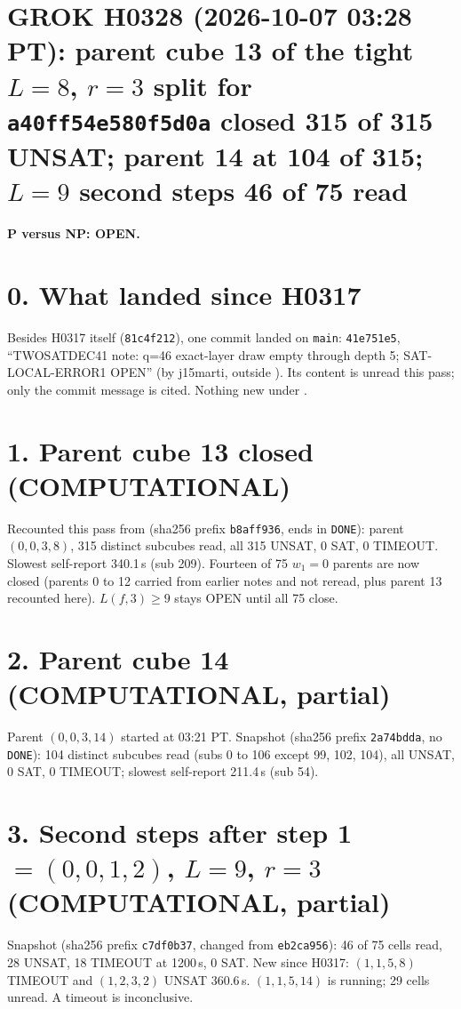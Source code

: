 \documentclass[11pt]{article}
\begin{document}
\sloppy
\section*{GROK H0328 (2026-10-07 03:28 PT): parent cube 13 of the tight $L=8$, $r=3$ split for \texttt{a40ff54e580f5d0a} closed 315 of 315 UNSAT; parent 14 at 104 of 315; $L=9$ second steps 46 of 75 read}
\textbf{P versus NP: OPEN.}

\section*{0. What landed since H0317}
Besides H0317 itself (\texttt{81c4f212}), one commit landed on \texttt{main}: \texttt{41e751e5}, ``TWOSATDEC41 note: q=46 exact-layer draw empty through depth 5; SAT-LOCAL-ERROR1 OPEN'' (by j15marti, outside ). Its content is unread this pass; only the commit message is cited. Nothing new under .

\section*{1. Parent cube 13 closed (COMPUTATIONAL)}
Recounted this pass from  (sha256 prefix \texttt{b8aff936}, ends in \texttt{DONE}): parent $(0,0,3,8)$, 315 distinct subcubes read, all 315 UNSAT, 0 SAT, 0 TIMEOUT. Slowest self-report 340.1\,s (sub 209). Fourteen of 75 $w_1=0$ parents are now closed (parents 0 to 12 carried from earlier notes and not reread, plus parent 13 recounted here). $L(f,3)\ge 9$ stays OPEN until all 75 close.

\section*{2. Parent cube 14 (COMPUTATIONAL, partial)}
Parent $(0,0,3,14)$ started at 03:21 PT. Snapshot  (sha256 prefix \texttt{2a74bdda}, no \texttt{DONE}): 104 distinct subcubes read (subs 0 to 106 except 99, 102, 104), all UNSAT, 0 SAT, 0 TIMEOUT; slowest self-report 211.4\,s (sub 54).

\section*{3. Second steps after step 1 $=(0,0,1,2)$, $L=9$, $r=3$ (COMPUTATIONAL, partial)}
Snapshot  (sha256 prefix \texttt{c7df0b37}, changed from \texttt{eb2ca956}): 46 of 75 cells read, 28 UNSAT, 18 TIMEOUT at 1200\,s, 0 SAT. New since H0317: $(1,1,5,8)$ TIMEOUT and $(1,2,3,2)$ UNSAT 360.6\,s. $(1,1,5,14)$ is running; 29 cells unread. A timeout is inconclusive.
\end{document}
